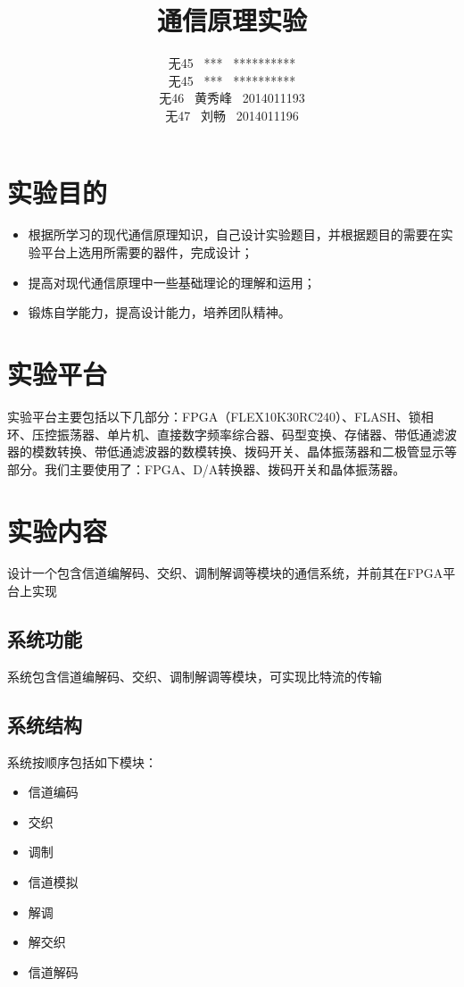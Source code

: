 \documentclass[UTF8]{ctexart}
\date{}
\title{\textbf{通信原理实验}}
\author{无45 \ *** \ **********\\
        无45 \ *** \ **********\\
        无46 \ 黄秀峰 \ 2014011193\\
        无47 \ 刘畅 \ 2014011196}
\begin{document}
\maketitle

\section{实验目的}

\begin{itemize}

\item 根据所学习的现代通信原理知识，自己设计实验题目，并根据题目的需要在实验平台上选用所需要的器件，完成设计；
\item 提高对现代通信原理中一些基础理论的理解和运用；
\item 锻炼自学能力，提高设计能力，培养团队精神。

\end{itemize}

\section{实验平台}

实验平台主要包括以下几部分：FPGA（FLEX10K30RC240）、FLASH、锁相环、压控振荡器、单片机、直接数字频率综合器、码型变换、存储器、带低通滤波器的模数转换、带低通滤波器的数模转换、拨码开关、晶体振荡器和二极管显示等部分。我们主要使用了：FPGA、D/A转换器、拨码开关和晶体振荡器。

\section{实验内容}

设计一个包含信道编解码、交织、调制解调等模块的通信系统，并前其在FPGA平台上实现

\subsection{系统功能}

系统包含信道编解码、交织、调制解调等模块，可实现比特流的传输

\subsection{系统结构}

系统按顺序包括如下模块：

\begin{itemize}

\item 信道编码
\item 交织
\item 调制
\item 信道模拟
\item 解调
\item 解交织
\item 信道解码

\end{itemize}
\end{document}

